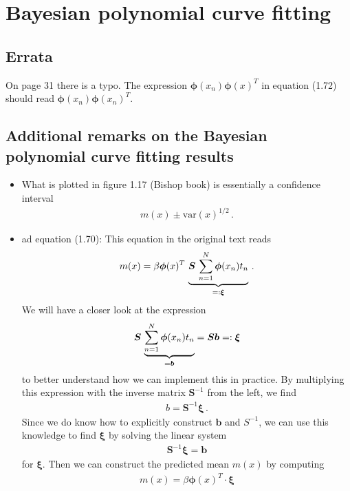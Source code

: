 \documentclass[11pt, DINA4, fleqn]{amsart}
\begin{document}
\section{Bayesian polynomial curve fitting}

\subsection{Errata}
On page 31 there is a typo. The expression
$\bm{\phi}(x_n)\bm{\phi}(x)^T$ in equation (1.72) should read $\bm{\phi}(x_n)\bm{\phi}(x_n)^T$.

\subsection{Additional remarks on the Bayesian polynomial curve fitting results}
\begin{itemize}
	\item What is plotted in figure 1.17 (Bishop book) is essentially a confidence interval
	\begin{align}
	m(x) \pm \text{var}(x)^{1/2} \, .
	\end{align}
	
	\item ad equation (1.70): This equation in the original text reads
	\begin{align}
	m(x) = \beta \bm{\phi}(x)^T \, \underbrace{\bm{S} \, \sum\displaylimits_{n=1}^{N}\bm{\phi}(x_n)t_n}_{=:\bm{\xi}} \, .
	\label{eq:bayesCurveFitMean}
	\end{align}
	We will have a closer look at the expression
	\begin{align}
	\bm{S} \, \underbrace{\sum\displaylimits_{n=1}^{N}\bm{\phi}(x_n)t_n}_{=\bm{b}}
	= \bm{S} \bm{b} =: \bm{\xi}
	\end{align}
	to better understand how we can implement this in practice. By multiplying this expression with the inverse matrix $\bm{S}^{-1}$ from the left, we find
	\begin{align}
	b = \bm{S}^{-1}\bm{\xi} \, .
	\end{align}
	Since we do know how to explicitly construct $\bm{b}$ and $S^{-1}$, we can use this knowledge to find $\bm{\xi}$ by solving the linear system
	\begin{align}
	\bm{S}^{-1} \bm{\xi} = \bm{b}
	\end{align}
	for $\bm{\xi}$. Then we can construct the predicted mean $m(x)$ by computing
	\begin{align}
	m(x) = \beta\bm{\phi}(x)^T \cdot \bm{\xi}
	\end{align}
	

\end{itemize}
\end{document}
